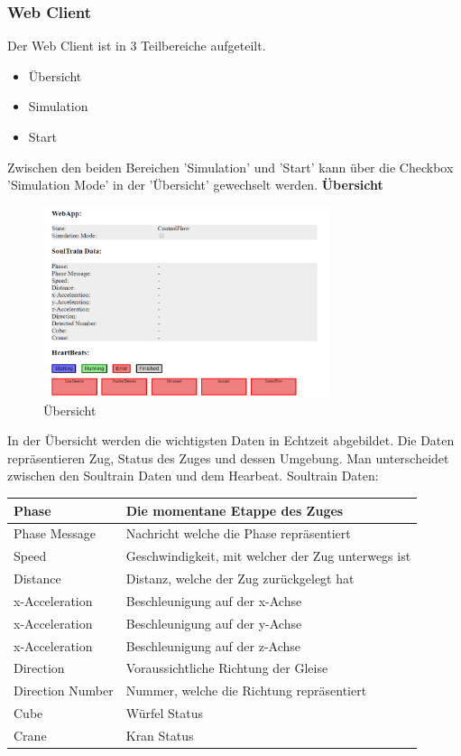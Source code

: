 \documentclass[../../main.tex]{subfiles}
\begin{document}
\subsubsection{Web Client}
Der Web Client ist in 3 Teilbereiche aufgeteilt.
\begin{itemize}
    \item Übersicht
    \item Simulation
    \item Start
\end{itemize}
Zwischen den beiden Bereichen 'Simulation' und 'Start' kann über die Checkbox 'Simulation Mode' in der 'Übersicht' gewechselt werden.
\textbf{Übersicht}\\
\begin{figure}[H] \centering
    \includegraphics[width=0.75\textwidth]{UebersichtWebApp}
    \caption{Übersicht}
    \label{fig:Uebersicht}
\end{figure}
In der Übersicht werden die wichtigsten Daten in Echtzeit abgebildet. Die Daten repräsentieren Zug, Status des Zuges und dessen Umgebung. 
Man unterscheidet zwischen den Soultrain Daten und dem Hearbeat.
Soultrain Daten:

\begin{table}[H]
    \begin{tabular}{ll}
    \hline
    Phase & Die momentane Etappe des Zuges \\ \hline
    Phase Message & Nachricht welche die Phase repräsentiert\\ \hline
    Speed & Geschwindigkeit, mit welcher der Zug unterwegs ist\\ \hline
    Distance & Distanz, welche der Zug zurückgelegt hat\\ \hline
    x-Acceleration & Beschleunigung auf der x-Achse  \\ \hline
    x-Acceleration & Beschleunigung auf der y-Achse \\ \hline
    x-Acceleration & Beschleunigung auf der z-Achse \\ \hline
    Direction & Voraussichtliche Richtung der Gleise \\ \hline
    Direction Number & Nummer, welche die Richtung repräsentiert \\ \hline
    Cube & Würfel Status \\ \hline
    Crane & Kran Status \\ \hline
    \end{tabular}
\end{table}
\end{document}
